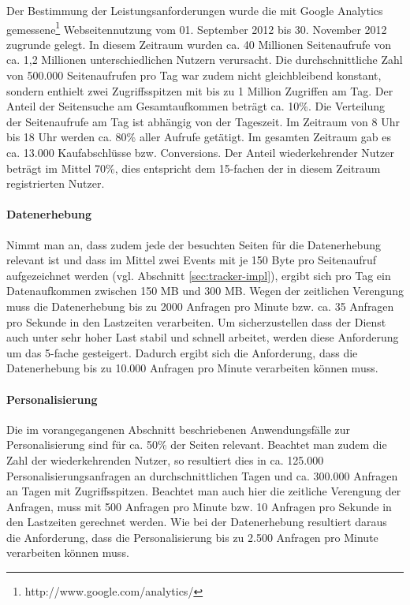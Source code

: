 Der Bestimmung der Leistungsanforderungen wurde die mit Google Analytics gemessene\footnote{http://www.google.com/analytics/} Webseitennutzung vom 01. September 2012 bis 30. November 2012 zugrunde gelegt. In diesem Zeitraum wurden ca. 40 Millionen Seitenaufrufe von ca. 1,2 Millionen unterschiedlichen Nutzern verursacht. Die durchschnittliche Zahl von 500.000 Seitenaufrufen pro Tag war zudem nicht gleichbleibend konstant, sondern enthielt zwei Zugriffsspitzen mit bis zu 1 Million Zugriffen am Tag. Der Anteil der Seitensuche am Gesamtaufkommen beträgt ca. 10\%. Die Verteilung der Seitenaufrufe am Tag ist abhängig von der Tageszeit. Im Zeitraum von 8 Uhr bis 18 Uhr werden ca. 80\% aller Aufrufe getätigt. Im gesamten Zeitraum gab es ca. 13.000 Kaufabschlüsse bzw. Conversions. Der Anteil wiederkehrender Nutzer beträgt im Mittel 70\%, dies entspricht dem 15-fachen der in diesem Zeitraum registrierten Nutzer. %

\paragraph{Datenerhebung} Nimmt man an, dass zudem jede der besuchten Seiten für die Datenerhebung relevant ist und dass im Mittel zwei Events mit je 150 Byte pro Seitenaufruf aufgezeichnet werden (vgl. Abschnitt \ref{sec:tracker-impl}), ergibt sich pro Tag ein Datenaufkommen zwischen 150 MB und 300 MB. Wegen der zeitlichen Verengung muss die Datenerhebung bis zu 2000 Anfragen pro Minute bzw. ca. 35 Anfragen pro Sekunde in den Lastzeiten verarbeiten. Um sicherzustellen dass der Dienst auch unter sehr hoher Last stabil und schnell arbeitet, werden diese Anforderung um das 5-fache gesteigert. Dadurch ergibt sich die Anforderung, dass die Datenerhebung bis zu 10.000 Anfragen pro Minute verarbeiten können muss.

\paragraph{Personalisierung} Die im vorangegangenen Abschnitt beschriebenen Anwendungsfälle zur Personalisierung sind für ca. 50\% der Seiten relevant.  Beachtet man zudem die Zahl der wiederkehrenden Nutzer, so resultiert dies in ca. 125.000 Personalisierungsanfragen an durchschnittlichen Tagen und ca. 300.000 Anfragen an Tagen mit Zugriffsspitzen. Beachtet man auch hier die zeitliche Verengung der Anfragen, muss mit 500 Anfragen pro Minute bzw. 10 Anfragen pro Sekunde in den Lastzeiten gerechnet werden. Wie bei der Datenerhebung resultiert daraus die Anforderung, dass die Personalisierung bis zu 2.500 Anfragen pro Minute verarbeiten können muss. %


